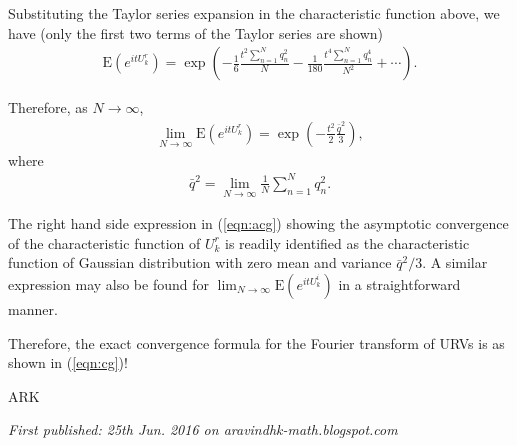 Substituting the Taylor series expansion in the characteristic function above, we have (only the first two terms of the Taylor series are shown)
\begin{align}\text{E}(e^{itU_k^r}) = \exp\left(-\frac{1}{6} \frac{t^2 \sum_{n = 1}^{N} q^2_n}{N} - \frac{1}{180}\frac{t^4 \sum_{n = 1}^{N} q^4_n}{N^2} + \cdots\right). \label{eqn:cg}\end{align}

Therefore, as $N\to \infty$, 
\begin{align}\lim_{N\to \infty} \text{E}(e^{itU_k^r}) = \exp\left(-\frac{t^2}{2} \frac{\bar{q}^2}{3}\right), \label{eqn:acg} \end{align}
where
\begin{align}\bar{q}^2 = \lim_{N\to \infty} \frac{1}{N}\sum_{n = 1}^{N} q_n^2.\end{align}

The right hand side expression in (\ref{eqn:acg}) showing the asymptotic convergence of the characteristic function of $U^r_k$ is readily identified as the characteristic function of Gaussian distribution with zero mean and variance $\bar{q}^2/3$. A similar expression may also be found for $\lim_{N\to \infty} \text{E}(e^{itU_k^i})$ in a straightforward manner.

Therefore, the exact convergence formula for the Fourier transform of URVs is as shown in (\ref{eqn:cg})!

ARK

\emph{First published: 25th Jun. 2016 on aravindhk-math.blogspot.com}
